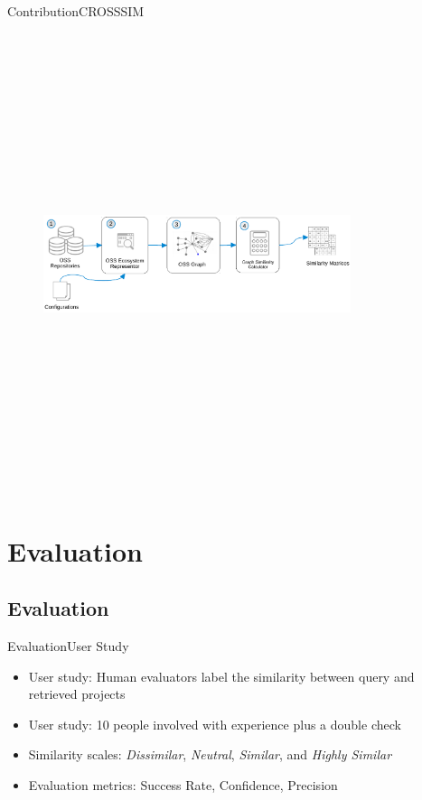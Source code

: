 \documentclass{beamer}
\begin{document}
\begin{frame}{Contribution}{CROSSSIM}
	\begin{figure}[!h]
	\includegraphics[width=9cm,height=13.5cm,keepaspectratio]{images/CrossSim.pdf}
	\centering
	\label{fig:CrossSim}
	\end{figure}
\end{frame}

\section{Evaluation}
\subsection{Evaluation}

\begin{frame}{Evaluation}{User Study}
	\begin{itemize}
	\item User study: Human evaluators label the similarity between query and retrieved projects
	\item User study: 10 people involved with experience plus a double check
	\item Similarity scales: \emph{Dissimilar}, \emph{Neutral}, \emph{Similar}, and \emph{Highly Similar}
	\item Evaluation metrics: Success Rate, Confidence, Precision
	\end{itemize}
\end{frame}
\end{document}

